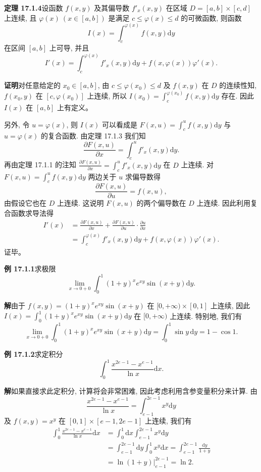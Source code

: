 \documentclass[UTF8, 12pt, fontset=fandol, oneside]{ctexart}
\begin{document}
\noindent\textbf{定理 17.1.4}\quad 设函数 $f(x,y)$ 及其偏导数 $f'_x(x,y)$ 在区域 $D=[a,b]\times[c,d]$ 上连续, 且 $\varphi(x)\ (x\in[a,b])$ 是满足 $c\leqslant \varphi(x)\leqslant d$ 的可微函数, 则函数
\[
  I(x)=\int_c^{\varphi(x)} f(x,y)\mathrm dy
\]
在区间 $[a,b]$ 上可导, 并且
\[
  I'(x)=\int_c^{\varphi(x)} f'_x(x,y)\mathrm dy
  + f(x,\varphi(x))\varphi'(x).
\]

\noindent\textbf{证明}\quad 对任意给定的 $x_0\in[a,b]$, 由 $c\leqslant\varphi(x_0)\leqslant d$ 及 $f(x,y)$ 在 $D$ 的连续性知, $f(x_0,y)$ 在 $[c,\varphi(x_0)]$ 上连续, 所以 $I(x_0)=\int_c^{\varphi(x_0)}f(x,y)\mathrm dy$ 存在. 因此 $I(x)$ 在 $[a,b]$ 上有定义。

另外, 令 $u=\varphi(x)$, 则 $I(x)$ 可以看成是 $F(x,u)=\int_c^u f(x,y)\mathrm dy$ 与 $u=\varphi(x)$ 的复合函数. 由定理 17.1.3 我们知
\[
  \frac{\partial F(x,u)}{\partial x}=\int_c^u f'_x(x,y)\mathrm dy.
\]
再由定理 17.1.1 的注知 $\frac{\partial F(x,u)}{\partial x}=\int_c^u f'_x(x,y)\mathrm dy$ 在 $D$ 上连续. 对 $F(x,u)=\int_c^u f(x,y)\mathrm dy$ 两边关于 $u$ 求偏导数得
\[
  \frac{\partial F(x,u)}{\partial u}=f(x,u),
\]
由假设它也在 $D$ 上连续. 这说明 $F(x,u)$ 的两个偏导数在 $D$ 上连续. 因此利用复合函数求导法得
\[
\begin{aligned}
  I'(x)
  &=\frac{\partial F(x,u)}{\partial x}
    +\frac{\partial F(x,u)}{\partial u}\cdot\frac{\partial u}{\partial x}\\
  &=\int_c^{\varphi(x)} f'_x(x,y)\mathrm dy
    +f(x,\varphi(x))\varphi'(x).
\end{aligned}
\]
证毕。

\noindent\textbf{例 17.1.1}\quad 求极限
\[
  \lim_{x\to0+0}\int_0^1 (1+y)^x e^{xy}\sin(x+y)\mathrm dy.
\]

\noindent\textbf{解}\quad 由于 $f(x,y)=(1+y)^x e^{xy}\sin(x+y)$ 在 $[0,+\infty)\times[0,1]$ 上连续, 因此 $I(x)=\int_0^1(1+y)^x e^{xy}\sin(x+y)\mathrm dy$ 在 $[0,+\infty)$ 上连续. 特别地, 我们有
\[
  \lim_{x\to0+0}\int_0^1 (1+y)^x e^{xy}\sin(x+y)\mathrm dy
  =\int_0^1 \sin y\,\mathrm dy
  =1-\cos1.
\]

\noindent\textbf{例 17.1.2}\quad 求定积分
\[
  \int_0^1 \frac{x^{2e-1}-x^{e-1}}{\ln x}\mathrm dx.
\]

\noindent\textbf{解}\quad 如果直接求此定积分, 计算将会非常困难, 因此考虑利用含参变量积分来计算. 由
\[
  \frac{x^{2e-1}-x^{e-1}}{\ln x}
  =
  \int_{e-1}^{2e-1} x^y\mathrm dy
\]
及 $f(x,y)=x^y$ 在 $[0,1]\times[e-1,2e-1]$ 上连续, 我们有
\[
\begin{aligned}
  \int_0^1 \frac{x^{2e-1}-x^{e-1}}{\ln x}\mathrm dx
  &=\int_0^1 \mathrm dx\int_{e-1}^{2e-1}x^y\mathrm dy\\
  &=\int_{e-1}^{2e-1}\mathrm dy\int_0^1x^y\mathrm dx
    =\int_{e-1}^{2e-1}\frac{\mathrm dy}{1+y}\\
  &=\left.\ln(1+y)\right|_{e-1}^{2e-1}=\ln2.
\end{aligned}
\]
\end{document}
